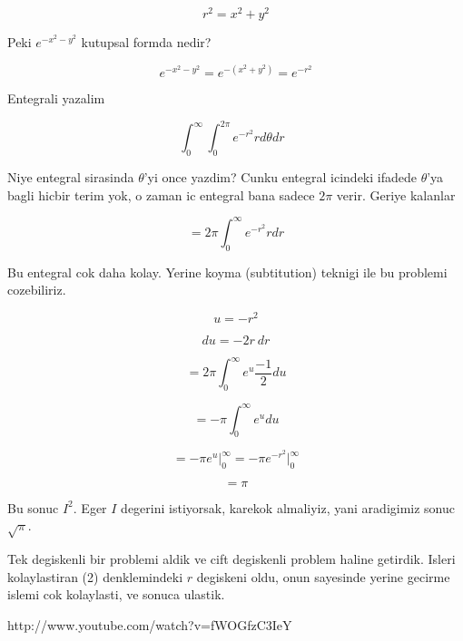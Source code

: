 \documentclass[12pt,fleqn]{article}
\begin{document}
\[ r^2 = x^2 + y^2 \]

Peki $e^{-x^2-y^2}$ kutupsal formda nedir? 

\[ e^{-x^2-y^2} = e^{-(x^2+y^2)} = e^{-r^2} \]

Entegrali yazalim

\[ \int_{0}^{\infty} \int_{0}^{2\pi} e^{-r^2} r d\theta dr 
\ \ \ \label{2}
\]

Niye entegral sirasinda $\theta$'yi once yazdim? Cunku entegral icindeki
ifadede $\theta$'ya bagli hicbir terim yok, o zaman ic entegral bana sadece
$2\pi$ verir. Geriye kalanlar

\[=  2\pi \int_{0}^{\infty} e^{-r^2} r dr \]

Bu entegral cok daha kolay. Yerine koyma (subtitution) teknigi ile bu
problemi cozebiliriz. 

\[ u = -r^2 \]

\[ du =  -2r \ dr\]

\[=  2\pi \int_{0}^{\infty} e^u \frac{-1}{2} du \]

\[=  -\pi \int_{0}^{\infty} e^u  du \]

\[=  -\pi  e^u  \bigg|_{0}^{\infty} = -\pi  e^{-r^2}  \bigg|_{0}^{\infty} \]

\[ = \pi \]

Bu sonuc $I^2$. Eger $I$ degerini istiyorsak, karekok almaliyiz, yani
aradigimiz sonuc $\sqrt{\pi}$. 

Tek degiskenli bir problemi aldik ve cift degiskenli problem haline
getirdik. Isleri kolaylastiran (2) denklemindeki $r$ degiskeni oldu, onun
sayesinde yerine gecirme islemi cok kolaylasti, ve sonuca ulastik. 



http://www.youtube.com/watch?v=fWOGfzC3IeY
\end{document}
